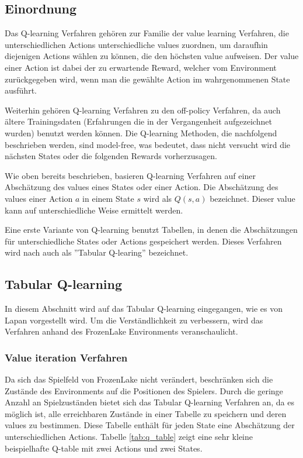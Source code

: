 \documentclass[11pt]{scrartcl}
\begin{document}
\subsection{Einordnung}
Das Q-learning Verfahren gehören zur Familie der value learning Verfahren, die
unterschiedlichen Actions unterschiedliche values zuordnen, um daraufhin diejenigen Actions
wählen zu können, die den höchsten value aufweisen. Der value einer Action ist dabei der
zu erwartende Reward, welcher vom Environment zurückgegeben wird, wenn man die gewählte
Action im wahrgenommenen State ausführt.

Weiterhin gehören Q-learning Verfahren zu den off-policy Verfahren, da auch ältere
Trainingsdaten (Erfahrungen die in der Vergangenheit aufgezeichnet wurden) benutzt
werden können. Die Q-learning Methoden, die nachfolgend beschrieben werden, sind
model-free, was bedeutet, dass nicht versucht wird die nächsten States oder die
folgenden Rewards vorherzusagen.

Wie oben bereits beschrieben, basieren Q-learning Verfahren auf einer Abschätzung des
values eines States oder einer Action. Die Abschätzung des values einer Action $a$ in
einem State $s$ wird als $Q(s, a)$ bezeichnet. Dieser value kann auf unterschiedliche
Weise ermittelt werden.

Eine erste Variante von Q-learning benutzt Tabellen, in denen die Abschätzungen
für unterschiedliche States oder Actions gespeichert werden. Dieses Verfahren wird nach
\cite[~S.193]{L2018} auch als ''Tabular Q-learing'' bezeichnet.


\subsection{Tabular Q-learning}
\label{sec:tab-q-learning}
In diesem Abschnitt wird auf das Tabular Q-learning eingegangen, wie es von Lapan
\cite[~S.193]{L2018} vorgestellt wird. Um die Ver\-ständ\-lich\-keit zu verbessern,
wird das Verfahren anhand des FrozenLake Environments veranschaulicht.


\subsubsection{Value iteration Verfahren}
Da sich das Spielfeld von FrozenLake nicht verändert, beschränken sich die Zustände des
Environments auf die Positionen des Spielers. Durch die geringe Anzahl an Spielzuständen
bietet sich das Tabular Q-learning Verfahren an, da es möglich ist, alle erreichbaren
Zustände in einer Tabelle zu speichern und deren values zu bestimmen. Diese Tabelle
enthält für jeden State eine Abschätzung der unterschiedlichen Actions.
Tabelle \ref{tab:q_table} zeigt eine sehr kleine beispielhafte Q-table mit zwei Actions
und zwei States.
\end{document}
